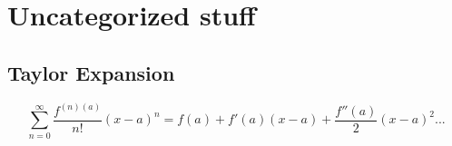 \chapter{Uncategorized stuff}
\section{Taylor Expansion}
\begin{equation}
 \sum_{n=0}^{\infty} \frac{f^{(n)(a)}}{n!}(x - a)^n = f(a) + f'(a) (x-a) + \frac{f''(a)}{2}(x-a)^2 ...
\end{equation}
